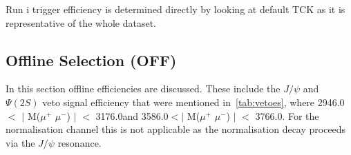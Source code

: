\begin{table}[H]
\label{tab:L0andHLT1Calib}
\end{table}



Run \Rn{1} trigger efficiency is determined directly by looking at default TCK as it is representative of the whole dataset.%





\subsection{Offline Selection (OFF)}

In this section offline efficiencies are discussed. These include the $J/\psi$ and $\Psi(2S)$ veto signal efficiency that were mentioned in~\autoref{tab:vetoes}, where 2946.0\mevcc $<$ $|$ M($\mu^{+}$ $\mu^{-}$) $|$ $<$ 3176.0\mevcc and 3586.0\mevcc $<|$ M($\mu^{+}$ $\mu^{-}$) $|$ $<$ 3766.0\mevcc. For the normalisation channel this is not applicable as the normalisation decay proceeds via the $J/\psi$ resonance.

